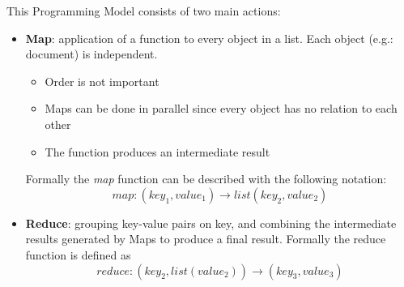 \documentclass[a4paper,11pt, twoside, openright]{article}
\begin{document}
		\bigskip


		\noindent
		This Programming Model consists of two main actions:
		\begin{itemize}
			\item \textbf{Map}: application of a function to every object in a list. Each object (e.g.: document) is independent.
			\begin{itemize}
				\item Order is not important
				\item Maps can be done in parallel since every object has no relation to each other
				\item The function produces an intermediate result
			\end{itemize}
			
			Formally the \textit{map} function can be described with the following notation: \[ map:(key_1, value_1) \to list(key_2, value_2) \]
			\item \textbf{Reduce}: grouping key-value pairs on key, and combining the intermediate results generated by Maps to produce a final result. Formally the reduce function is defined as \[ reduce:(key_2, list(value_2)) \to (key_3, value_3)  \]
		\end{itemize}
\end{document}
